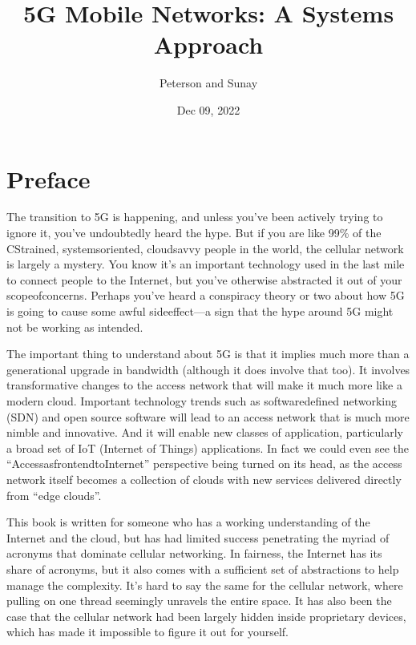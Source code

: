 \documentclass[a4paper,11pt,english]{sphinxmanual}
\title{5G Mobile Networks: A Systems Approach}
\date{Dec 09, 2022}
\author{Peterson and Sunay}
\begin{document}
\pagestyle{empty}
\sphinxmaketitle
\pagestyle{plain}
\sphinxtableofcontents
\pagestyle{normal}
\label{\detokenize{index::doc}}



\chapter*{Preface}
\label{\detokenize{preface:preface}}\label{\detokenize{preface::doc}}
\sphinxAtStartPar
The transition to 5G is happening, and unless you’ve been actively
trying to ignore it, you’ve undoubtedly heard the hype. But if you are
like 99\% of the CS\sphinxhyphen{}trained, systems\sphinxhyphen{}oriented, cloud\sphinxhyphen{}savvy people in
the world, the cellular network is largely a mystery. You know it’s an
important technology used in the last mile to connect people to the
Internet, but you’ve otherwise abstracted it out of your
scope\sphinxhyphen{}of\sphinxhyphen{}concerns. Perhaps you’ve heard a conspiracy theory or two
about how 5G is going to cause some awful side\sphinxhyphen{}effect—a sign that the
hype around 5G might not be working as intended.

\sphinxAtStartPar
The important thing to understand about 5G is that it implies much more
than a generational upgrade in bandwidth (although it does involve
that too). It involves transformative
changes to the access network that will make it much more like a
modern cloud. Important technology trends such as software\sphinxhyphen{}defined
networking (SDN) and open source software will lead to an
access network that is much more nimble and innovative. And
it will enable new classes of application, particularly a broad set of
IoT (Internet of Things) applications. In fact we could even see the
“Access\sphinxhyphen{}as\sphinxhyphen{}frontend\sphinxhyphen{}to\sphinxhyphen{}Internet” perspective being turned on its head, as the
access network itself becomes a collection of clouds with new services
delivered directly from “edge clouds”.

\sphinxAtStartPar
This book is written for someone who has a working understanding of the
Internet and the cloud, but has had limited success penetrating the myriad
of acronyms that dominate cellular networking. In fairness, the Internet
has its share of acronyms, but it also comes with a sufficient set of
abstractions to help manage the complexity. It’s hard to say the same
for the cellular network, where pulling on one thread seemingly unravels
the entire space. It has also been the case that the cellular network
had been largely hidden inside proprietary devices, which has made it
impossible to figure it out for yourself.
\end{document}
